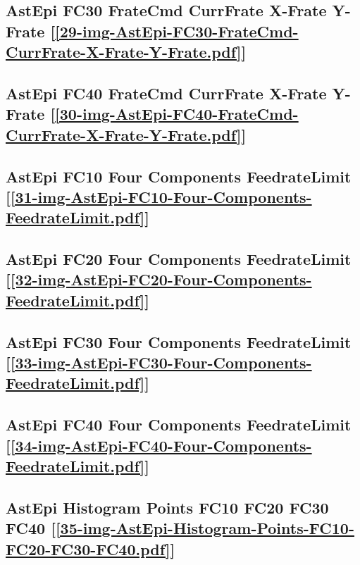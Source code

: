\subsection       {AstEpi FC30 FrateCmd CurrFrate X-Frate Y-Frate
	[\ref      {29-img-AstEpi-FC30-FrateCmd-CurrFrate-X-Frate-Y-Frate.pdf}] }
\label{ssec-29-img-AstEpi-FC30-FrateCmd-CurrFrate-X-Frate-Y-Frate.pdf}

\subsection       {AstEpi FC40 FrateCmd CurrFrate X-Frate Y-Frate
	[\ref      {30-img-AstEpi-FC40-FrateCmd-CurrFrate-X-Frate-Y-Frate.pdf}] }
\label{ssec-30-img-AstEpi-FC40-FrateCmd-CurrFrate-X-Frate-Y-Frate.pdf}

\subsection       {AstEpi FC10 Four Components FeedrateLimit
	[\ref      {31-img-AstEpi-FC10-Four-Components-FeedrateLimit.pdf}] }
\label{ssec-31-img-AstEpi-FC10-Four-Components-FeedrateLimit.pdf}

\subsection       {AstEpi FC20 Four Components FeedrateLimit
	[\ref      {32-img-AstEpi-FC20-Four-Components-FeedrateLimit.pdf}] }
\label{ssec-32-img-AstEpi-FC20-Four-Components-FeedrateLimit.pdf}

\subsection       {AstEpi FC30 Four Components FeedrateLimit
	[\ref      {33-img-AstEpi-FC30-Four-Components-FeedrateLimit.pdf}] }
\label{ssec-33-img-AstEpi-FC30-Four-Components-FeedrateLimit.pdf}

\subsection       {AstEpi FC40 Four Components FeedrateLimit
	[\ref      {34-img-AstEpi-FC40-Four-Components-FeedrateLimit.pdf}]}
\label{ssec-34-img-AstEpi-FC40-Four-Components-FeedrateLimit.pdf}

\subsection       {AstEpi Histogram Points FC10 FC20 FC30 FC40
	[\ref      {35-img-AstEpi-Histogram-Points-FC10-FC20-FC30-FC40.pdf}] }
\label{ssec-35-img-AstEpi-Histogram-Points-FC10-FC20-FC30-FC40.pdf}

